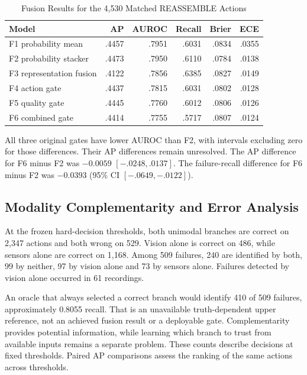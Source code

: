 \begin{table}[htbp]
\caption{Fusion Results for the 4,530 Matched REASSEMBLE Actions}\label{tab:reassemble-fusion}
\centering\small

\begin{tabular}{lrrrrr}\hline
Model & AP & AUROC & Recall & Brier & ECE\\\hline
F1 probability mean & .4457 & .7951 & .6031 & .0834 & .0355\\
F2 probability stacker & .4473 & .7950 & .6110 & .0784 & .0138\\
F3 representation fusion & .4122 & .7856 & .6385 & .0827 & .0149\\
F4 action gate & .4437 & .7815 & .6031 & .0802 & .0128\\
F5 quality gate & .4445 & .7760 & .6012 & .0806 & .0126\\
F6 combined gate & .4414 & .7755 & .5717 & .0807 & .0124\\\hline
\end{tabular}
\end{table}

All three original gates have lower AUROC than F2, with intervals excluding zero for
those differences. Their AP differences remain unresolved. The AP difference for F6
minus F2 was $-0.0059$ $[-.0248,.0137]$. The failure-recall difference for F6 minus F2
was $-0.0393$ (95\% CI $[-.0649,-.0122]$).

\subsection{Modality Complementarity and Error Analysis}
At the frozen hard-decision thresholds, both unimodal branches are correct on 2,347
actions and both wrong on 529. Vision alone is correct on 486, while sensors alone are
correct on 1,168. Among 509 failures, 240 are identified by both, 99 by neither, 97 by
vision alone and 73 by sensors alone. Failures detected by vision alone occurred in 61
recordings.

An oracle that always selected a correct branch would identify 410 of 509 failures,
approximately 0.8055 recall. That is an unavailable truth-dependent upper reference, not
an achieved fusion result or a deployable gate. Complementarity provides potential
information, while learning which branch to trust from available inputs remains a
separate problem. These counts describe decisions at fixed thresholds. Paired AP
comparisons assess the ranking of the same actions across thresholds.

